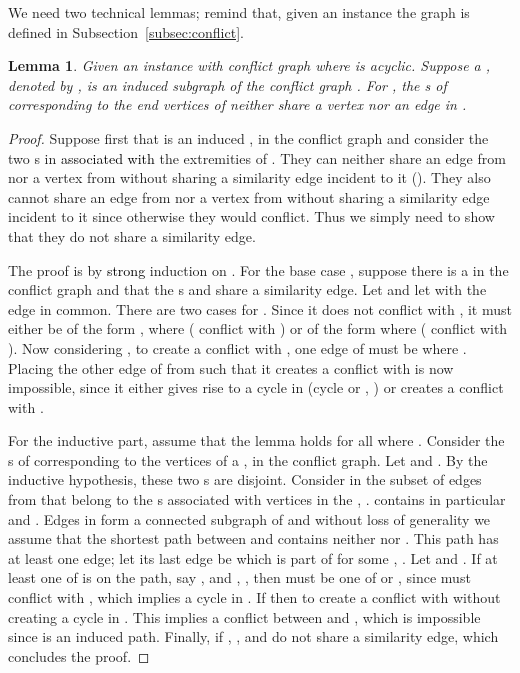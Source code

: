 \documentclass[final]{dmtcs-episciences}
\newtheorem{lemma}[theorem]{Lemma}
\newcommand\mar[1]{\textcolor{black}{#1}}
\begin{document}
We need two technical lemmas; remind that, given an instance  the graph   is defined in Subsection~\ref{subsec:conflict}.  
\begin{lemma}
\label{edgesharing}
Given an instance  with conflict graph  where  is acyclic.
Suppose a , denoted by , is an induced subgraph of the conflict graph . For , the 
s of  corresponding to the 
end vertices of  neither share a vertex nor an edge in . 
\end{lemma}

\begin{proof}
Suppose first that  is an induced  ,  in the conflict graph and consider the two s in  \mar{associated with} the extremities of . They can neither
share an edge from   nor a vertex from  without sharing a similarity edge incident to it ().
They also cannot share an edge from  nor a vertex from  without sharing a similarity edge incident to it since otherwise they would conflict.
Thus we simply need to show that they do not share 
a similarity edge.

The proof is by \mar{strong} induction on . For the base case  , suppose there is a  \mar{} in the conflict graph and that 
the s  and  share a similarity edge. Let   and 
let   with the edge  in common. There are two cases for 
. Since it does not conflict with , it  must either be of the form , where  ( conflict with ) or of the form  where  ( conflict with ). 
Now considering , to create a conflict with , 
one edge of  must be  where . Placing the other edge of  from \mar{} such that 
it creates a conflict with  is now impossible, since it either gives rise to a cycle in  (cycle \mar{} or \mar{}, )  or creates a conflict with .

For the inductive part, assume that the lemma holds for all  where . Consider the s of  corresponding to the vertices of a , \mar{} in the conflict graph. 
Let  and . By the inductive hypothesis, these two s are disjoint. Consider in 
 the subset  of edges from  that belong to the s  associated with vertices in the  , .  contains in particular  and . Edges in  form a connected subgraph  of  and without loss of generality we assume that the shortest path  between  and   contains neither  nor . This path  has at least one edge; let its last edge be  which is part of  for some , . Let   and . If at least one of  is on the path, say , and , , then  must be one of  or , since  must conflict with , which implies a cycle in .  If  then  to create a conflict with  without creating a cycle in .   
This implies a conflict between  and , which is impossible since  
 is an induced path. Finally, if , ,  and  do not share a similarity edge, which concludes the proof.
\end{proof}
\end{document}
